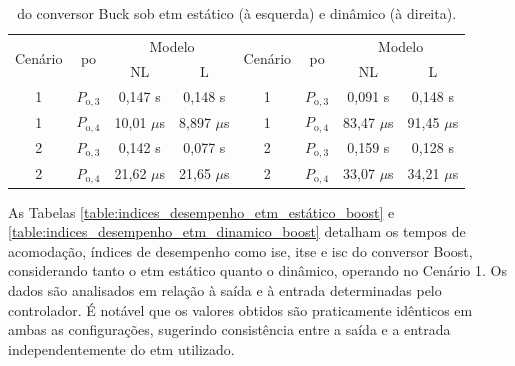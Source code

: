 \vspace{12pt}
\begin{table}[H]
  \centering
  \captionsetup{justification=centering}
  \setlength{\tabcolsep}{10pt}
  \begin{tabular}{cccccccc}
    \toprule
    \multirow{2}{*}{\centering Cenário} & \multirow{2}{*}{\centering \acrshort{po}} & \multicolumn{2}{c}{\centering Modelo} & \multirow{2}{*}{\centering Cenário} & \multirow{2}{*}{\centering \acrshort{po}} & \multicolumn{2}{c}{\centering Modelo}                     \\
    \cmidrule(lr){3-4} \cmidrule(lr){7-8}                      &                                           & NL                                    & L                                   &                                           &                                       & NL      & L       \\
    \midrule
    1  & $P_{\mathrm{o}, 3}$                                  & 0,147 s                               & 0,148 s      &
    1   & $P_{\mathrm{o}, 3}$                                 & 0,091 s                               & 0,148 s      \\
    1  & $P_{\mathrm{o}, 4}$                                  & 10,01 $\mu$s                    & 8,897 $\mu$s & 
    1   & $P_{\mathrm{o}, 4}$                                 & 83,47 $\mu$s                          & 91,45 $\mu$s \\
    2  & $P_{\mathrm{o}, 3}$                                  & 0,142 s                               & 0,077 s      &
    2   & $P_{\mathrm{o}, 3}$                                 & 0,159 s                               & 0,128 s      \\
    2   & $P_{\mathrm{o}, 4}$                                 & 21,62 $\mu$s                          & 21,65 $\mu$s &
      2 & $P_{\mathrm{o}, 4}$                                    & 33,07 $\mu$s                          & 34,21 $\mu$s \\
    \bottomrule
  \end{tabular}
  \caption{ do conversor Buck sob \acrshort{etm} estático (à esquerda) e dinâmico (à direita).}
  \label{table:imees_boost_static_dynamic}
\end{table}

As Tabelas \ref{table:indices_desempenho_etm_estático_boost} e \ref{table:indices_desempenho_etm_dinamico_boost} detalham os tempos de acomodação, índices de desempenho como \acrshort{ise}, \acrshort{itse} e \acrshort{isc} do conversor Boost, considerando tanto o \acrshort{etm} estático quanto o dinâmico, operando no Cenário 1. Os dados são analisados em relação à saída e à entrada determinadas pelo controlador. É notável que os valores obtidos são praticamente idênticos em ambas as configurações, sugerindo consistência entre a saída e a entrada independentemente do \acrshort{etm} utilizado. 

